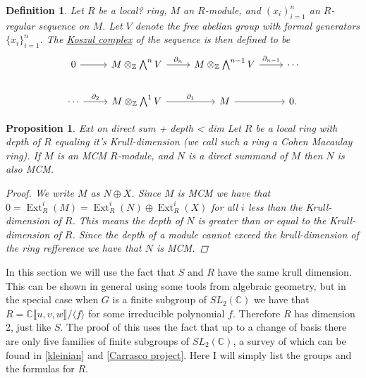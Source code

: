 \documentclass[11pt, a4paper, english]{article}
\newtheorem{prop}{Proposition}
\numberwithin{prop}{section}
\numberwithin{lemma}{section}
\numberwithin{theorem}{section}
\newtheorem{defin}{Definition}
\numberwithin{defin}{section}
\numberwithin{example}{section}
\newcommand{\C}{\mathbb{C}}
\newcommand{\Z}{\mathbb{Z}}
\DeclareMathOperator{\Ext}{Ext}
\begin{document}
\begin{defin}
Let $R$ be a {\color{red}local?} ring, $M$ an $R$-module, and $(x_i)_{i=1}^n$ an $R$-regular sequence on $M$. Let $V$ denote the free abelian group with formal generators $\{ x_i \}_{i=1}^n$. The \underline{Koszul complex} of the sequence is then defined to be
\begin{equation*}
\begin{tikzcd}
0 \arrow[r] & M \otimes_\Z \bigwedge^n V \arrow[r]{}{\partial_n} & M \otimes_\Z \bigwedge^{n-1} V \arrow[r]{}{\partial_{n-1}} & \cdots \\ 
\cdots \arrow[r]{}{\partial_2} & M \otimes_\Z \bigwedge^1 V \arrow[r]{}{\partial_1} & M \arrow[r] & 0.
\end{tikzcd}
\end{equation*}
\end{defin}

\begin{prop}
{\color{red} Ext on direct sum + depth < dim}
Let $R$ be a local ring with depth of $R$ equaling it's Krull-dimension (we call such a ring a Cohen Macaulay ring). If $M$ is an MCM $R$-module, and $N$ is a direct summand of $M$ then $N$ is also MCM.
\begin{proof}
We write $M$ as $N \oplus X$. Since $M$ is MCM we have that $0 = \Ext^i_R(M) = \Ext^i_R(N) \oplus \Ext^i_R(X)$ for all $i$ less than the Krull-dimension of $R$. This means the depth of $N$ is greater than or equal to the Krull-dimension of $R$. Since the depth of a module cannot exceed the krull-dimension of the ring {\color{red} refference} we have that $N$ is MCM.
\end{proof}
\end{prop}

In this section we will use the fact that $S$ and $R$ have the same krull dimension. This can be shown in general using some tools from algebraic geometry, but in the special case when $G$ is a finite subgroup of $SL_2(\C)$ we have that $R = \C \llbracket u, v, w \rrbracket / \langle f \rangle$ for some irreducible polynomial $f$. Therefore $R$ has dimension 2, just like $S$. The proof of this uses the fact that up to a change of basis there are only five families of finite subgroups of $SL_2(\C)$, a survey of which can be found in [\href{https://staff.fnwi.uva.nl/r.r.j.bocklandt/notes/kleinian.pdf}{kleinian}] and [\href{https://homepages.warwick.ac.uk/~masda/McKay/Carrasco_Project.pdf}{Carrasco project}]. Here I will simply list the groups and the formulas for $R$.
\end{document}
